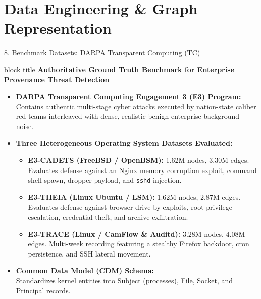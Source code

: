\documentclass[aspectratio=169,10pt]{beamer}
\begin{document}
\section{Data Engineering \& Graph Representation}

\begin{frame}[t]{8. Benchmark Datasets: DARPA Transparent Computing (TC)}
\vspace{-0.2em}
\begin{beamercolorbox}[rounded=true,shadow=false,sep=0.32em,wd=\textwidth]{block title}
\textbf{\scriptsize Authoritative Ground Truth Benchmark for Enterprise Provenance Threat Detection}
\end{beamercolorbox}
\vspace{0.10em}
{\fontsize{7.4pt}{10.4pt}\selectfont
\begin{itemize}\itemsep0.20em
  \item \textbf{DARPA Transparent Computing Engagement 3 (E3) Program:}\\
  Contains authentic multi-stage cyber attacks executed by nation-state caliber red teams interleaved with dense, realistic benign enterprise background noise.
  \item \textbf{Three Heterogeneous Operating System Datasets Evaluated:}
    \begin{itemize}\itemsep0.15em
      \item \textbf{E3-CADETS (FreeBSD / OpenBSM):} 1.62M nodes, 3.30M edges. Evaluates defense against an Nginx memory corruption exploit, command shell spawn, dropper payload, and \texttt{sshd} injection.
      \item \textbf{E3-THEIA (Linux Ubuntu / LSM):} 1.62M nodes, 2.87M edges. Evaluates defense against browser drive-by exploits, root privilege escalation, credential theft, and archive exfiltration.
      \item \textbf{E3-TRACE (Linux / CamFlow \& Auditd):} 3.28M nodes, 4.08M edges. Multi-week recording featuring a stealthy Firefox backdoor, cron persistence, and SSH lateral movement.
    \end{itemize}
  \item \textbf{Common Data Model (CDM) Schema:}\\
  Standardizes kernel entities into Subject (processes), File, Socket, and Principal records.
\end{itemize}
}
\end{frame}
\end{document}

